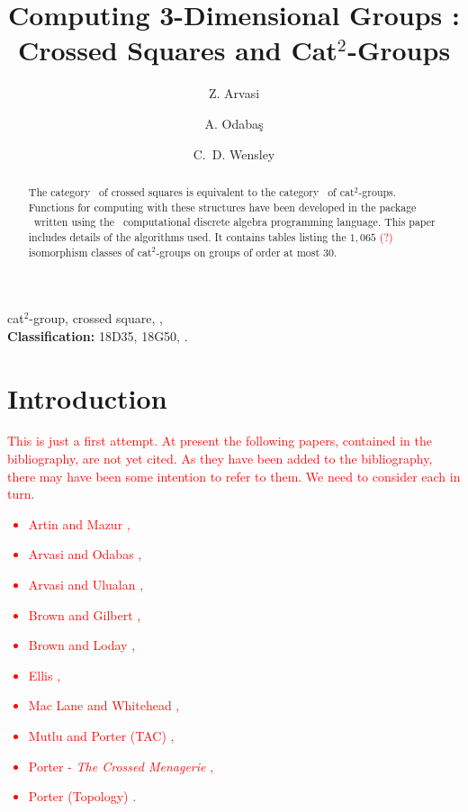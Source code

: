 \documentclass[a4paper,11pt]{article}
\theoremstyle{plain}
\theoremstyle{definition}
\begin{document}
\title{Computing 3-Dimensional Groups : Crossed Squares and  Cat$^2$-Groups}

\author[a]{Z. Arvasi}
\author[a]{A. Odaba\c{s}}
\author[b]{C.~D. Wensley}

\date{}

\maketitle

\begin{abstract}
The category \catXSq\ of crossed squares is equivalent to 
the category \catCatt\ of cat$^2$-groups. 
Functions for computing with these structures have been developed in 
the package \XMod\ written using the \GAP\ computational discrete algebra 
programming language.
This paper includes details of the algorithms used. 
It contains tables listing the $1,065$ \textcolor{red}{(?)} 
isomorphism classes of cat$^2$-groups on groups of order at most $30$. 


\end{abstract}

 cat$^2$-group, crossed square, \GAP, \XMod\ 
\\ {\bf Classification:} 18D35, 18G50, .

\section{Introduction}

\textcolor{red}
{This is just a first attempt. 
At present the following papers, contained in the bibliography, 
are not yet cited. 
As they have been added to the bibliography, 
there may have been some intention to refer to them. 
We need to consider each in turn.} 
\textcolor{red}
{\begin{itemize}
\item
Artin and Mazur \cite{artin-mazur}, 
\item 
Arvasi and Odabas \cite{arvasi-odabas}, 
\item 
Arvasi and Ulualan \cite{arvasi-ulualan}, 
\item 
Brown and Gilbert \cite{brown-gilbert}, 
\item 
Brown and Loday \cite{brown-loday}, 
\item
Ellis \cite{Ellis}, 
\item 
Mac Lane and Whitehead \cite{maclane-whitehead}, 
\item 
Mutlu and Porter (TAC) \cite{mutlu-porter-tac}, 
\item 
Porter - \emph{The Crossed Menagerie} \cite{porter-notes}, 
\item 
Porter (Topology) \cite{porter-topology}. 
\end{itemize}
} 
\end{document}
